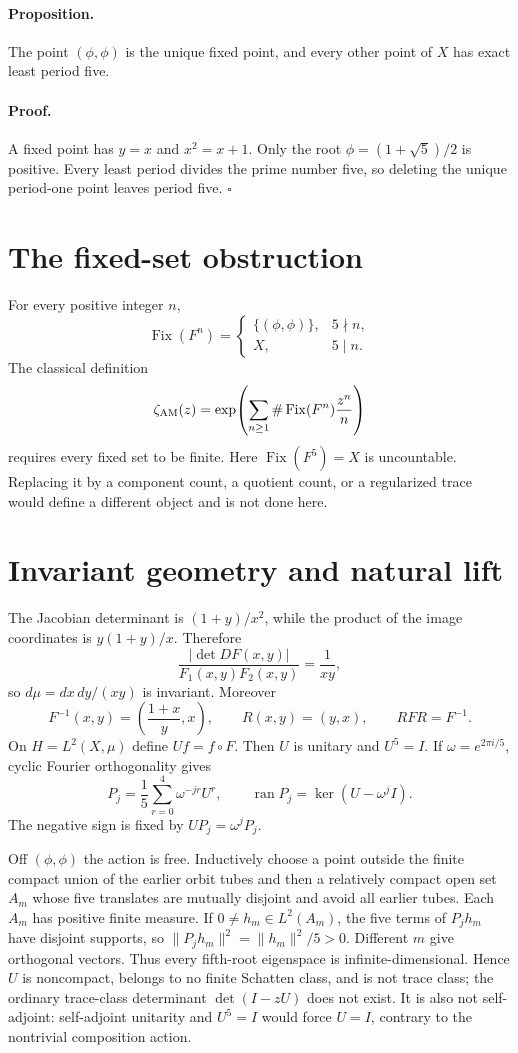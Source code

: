 \documentclass[10pt]{article}
\begin{document}
\paragraph{Proposition.}
The point $(\phi,\phi)$ is the unique fixed point, and every other point of
$X$ has exact least period five.

\paragraph{Proof.}
A fixed point has $y=x$ and $x^2=x+1$.  Only the root
$\phi=(1+\sqrt5)/2$ is positive.  Every least period divides the prime
number five, so deleting the unique period-one point leaves period five.
\hfill$\square$

\section{The fixed-set obstruction}
For every positive integer $n$,
\[
\operatorname{Fix}(F^n)=
\begin{cases}
\{(\phi,\phi)\},&5\nmid n,\\
X,&5\mid n.
\end{cases}
\]
The classical definition
\[
\zeta_{\rm AM}(z)=\exp\!\left(\sum_{n\ge1}
\#\operatorname{Fix}(F^n)\frac{z^n}{n}\right)
\]
requires every fixed set to be finite.  Here $\operatorname{Fix}(F^5)=X$
is uncountable.  Replacing it by a component count, a quotient count, or a
regularized trace would define a different object and is not done here.

\section{Invariant geometry and natural lift}
The Jacobian determinant is $(1+y)/x^2$, while the product of the image
coordinates is $y(1+y)/x$.  Therefore
\[
 \frac{|\det DF(x,y)|}{F_1(x,y)F_2(x,y)}=\frac1{xy},
\]
so $d\mu=dx\,dy/(xy)$ is invariant.  Moreover
\[
F^{-1}(x,y)=\left(\frac{1+x}{y},x\right),\qquad
R(x,y)=(y,x),\qquad RFR=F^{-1}.
\]
On $H=L^2(X,\mu)$ define $Uf=f\circ F$.  Then $U$ is unitary and
$U^5=I$.  If $\omega=e^{2\pi i/5}$, cyclic Fourier orthogonality gives
\[
P_j=\frac15\sum_{r=0}^4\omega^{-jr}U^r,
\qquad \operatorname{ran}P_j=\ker(U-\omega^jI).
\]
The negative sign is fixed by $UP_j=\omega^jP_j$.

Off $(\phi,\phi)$ the action is free.  Inductively choose a point outside
the finite compact union of the earlier orbit tubes and then a relatively
compact open set $A_m$ whose five translates are mutually disjoint and
avoid all earlier tubes.  Each $A_m$ has positive finite measure.  If
$0\ne h_m\in L^2(A_m)$, the five terms of $P_jh_m$ have disjoint supports,
so $\|P_jh_m\|^2=\|h_m\|^2/5>0$.  Different $m$ give orthogonal vectors.
Thus every fifth-root eigenspace is infinite-dimensional.  Hence $U$ is
noncompact, belongs to no finite Schatten class, and is not trace class;
the ordinary trace-class determinant $\det(I-zU)$ does not exist.  It is
also not self-adjoint: self-adjoint unitarity and $U^5=I$ would force $U=I$,
contrary to the nontrivial composition action.
\end{document}
